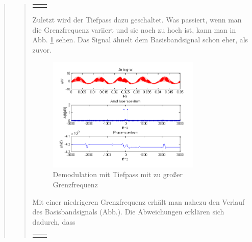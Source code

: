 \begin{quote}
\begin{quote}
\begin{center}
\begin{tabular}{ll}
\begin{minipage}{0.6\textwidth}
            \end{minipage}
        
        \end{tabular}
        \end{center}
               
        Zuletzt wird der Tiefpass dazu geschaltet. Was passiert, wenn man die
        Grenzfrequenz variiert und sie noch zu hoch ist, kann man in Abb.
        \ref{fig:TPmitzugrosserGF} sehen. Das Signal ähnelt dem Basisbandsignal
        schon eher, als zuvor.
        
        \begin{figure}[H]
		\begin{center}
			\includegraphics[width=0.8\textwidth]{Bilder/Demo_Sin_2k_100Hz_mo_mitTiefpasszugrosseGrenzfrequenz}
		\end{center}
		\caption{Demodulation mit Tiefpass mit zu großer Grenzfrequenz}
		\label{fig:TPmitzugrosserGF}
	    \end{figure}
	    
	    Mit einer niedrigeren Grenzfrequenz erhält man nahezu den Verlauf des
	    Basisbandsignals (Abb.). Die Abweichungen erklären sich dadurch, dass
	    
	    \begin{center}
        \begin{tabular}{ll}
        
        \hspace{-5cm}
            \begin{minipage}{0.6\textwidth}
                

\end{minipage}
\end{tabular}
\end{center}
\end{quote}
\end{quote}
